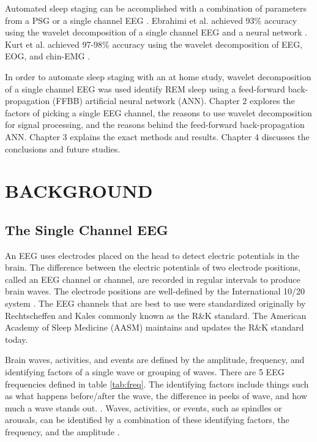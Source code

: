 \documentclass[12pt, oneside]{book}
\begin{document}
Automated sleep staging can be accomplished with a combination of parameters from a PSG \cite{sinha_artificial_2008} \cite{fraiwan_automated_2012} \cite{rao_detecting_2014} \cite{kurt_ann-based_2009} \cite{shambroom_validation_2012} or a single channel EEG \cite{ventouras_sleep_2005} \cite{ebrahimi_automatic_2008} \cite{crasto_wavelet_2017} \cite{alvarez_usefulness_2017}. Ebrahimi et al. achieved 93\% accuracy using the wavelet decomposition of a single channel EEG and a neural network \cite{ebrahimi_automatic_2008}. Kurt et al. achieved 97-98\% accuracy using the wavelet decomposition of EEG, EOG, and chin-EMG \cite{kurt_ann-based_2009}. 

In order to automate sleep staging with an at home study, wavelet decomposition of a single channel EEG was used identify REM sleep using a feed-forward back-propagation (FFBB) artificial neural network (ANN). Chapter 2 explores the factors of picking a single EEG channel, the reasons to use wavelet decomposition for signal processing, and the reasons behind the feed-forward back-propagation ANN. Chapter 3 explains the exact methods and results. Chapter 4 discusses the conclusions and future studies.
\chapter{\textbf{BACKGROUND}}

\section{\textbf{The Single Channel EEG}}
An EEG uses electrodes placed on the head to detect electric potentials in the brain. The difference between the electric potentials of two electrode positions, called an EEG channel or channel, are recorded in regular intervals to produce brain waves. The electrode positions are well-defined by the International 10/20 system \cite{berry_md_chair_aasm_nodate} \cite{noauthor_10/20_nodate-1} \cite{noauthor_10/20_nodate}. The EEG channels that are best to use were standardized originally by Rechtscheffen and Kales \cite{rechtschaffen_manual_nodate} commonly known as the R\&K standard. The American Academy of Sleep Medicine (AASM) maintains and updates the R\&K standard today.

Brain waves, activities, and events are defined by the amplitude, frequency, and identifying factors of a single wave or grouping of waves. There are 5 EEG frequencies defined in table \ref{tab:freq}. The identifying factors include things such as what happens before/after the wave, the difference in peeks of wave, and how much a wave stands out. \cite{berry_md_chair_aasm_nodate}. Waves, activities, or events, such as spindles or arousals, can be identified by a combination of these identifying factors, the frequency, and the amplitude \cite{berry_md_chair_aasm_nodate}. 
\end{document}
